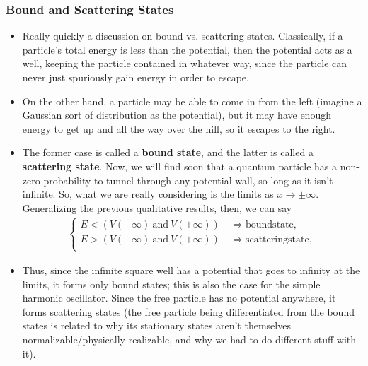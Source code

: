 \subsubsection*{Bound and Scattering States}
\begin{itemize}
    \item Really quickly a discussion on bound vs. scattering states. Classically, if a particle's total energy is less than the potential, then the potential acts as a well, keeping the particle contained in whatever way, since the particle can never just spuriously gain energy in order to escape.
    \item On the other hand, a particle may be able to come in from the left (imagine a Gaussian sort of distribution as the potential), but it may have enough energy to get up and all the way over the hill, so it escapes to the right.
    \item The former case is called a \textbf{bound state}, and the latter is called a \textbf{scattering state}. Now, we will find soon that a quantum particle has a non-zero probability to tunnel through any potential wall, so long as it isn't infinite. So, what we are really considering is the limits as $x\rightarrow\pm\infty$. Generalizing the previous qualitative results, then, we can say
        \begin{equation*}
            \begin{alignedat}{1}
            \begin{cases}
                E < (V(-\infty)\ \mathrm{and}\ V(+\infty))\ &\Rightarrow \mathrm{bound state,} \\
                E > (V(-\infty)\ \mathrm{and}\ V(+\infty))\ &\Rightarrow \mathrm{scattering state,} \\
            \end{cases}
            \end{alignedat}
        \end{equation*}
    \item Thus, since the infinite square well has a potential that goes to infinity at the limits, it forms only bound states; this is also the case for the simple harmonic oscillator. Since the free particle has no potential anywhere, it forms scattering states (the free particle being differentiated from the bound states is related to why its stationary states aren't themselves normalizable/physically realizable, and why we had to do different stuff with it).
\end{itemize}




